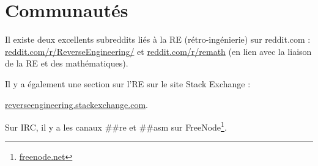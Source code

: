 \chapter{Communautés}

Il existe deux excellents subreddits liés à la \ac{RE} (rétro-ingénierie) sur reddit.com :\\
\href{http://www.reddit.com/r/ReverseEngineering/}{reddit.com/r/ReverseEngineering/} et
\href{http://www.reddit.com/r/remath}{reddit.com/r/remath}
(en lien avec la liaison de la \ac{RE} et des mathématiques).

Il y a également une section sur l'\ac{RE} sur le site Stack Exchange :

\par \href{http://reverseengineering.stackexchange.com/}{reverseengineering.stackexchange.com}.

Sur IRC, il y a les canaux \#\#re et \#\#asm sur
FreeNode\footnote{\href{https://freenode.net/}{freenode.net}}.

